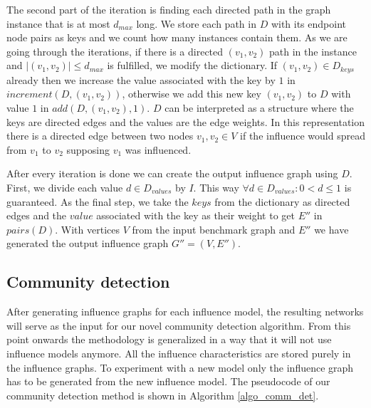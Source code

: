 \documentclass[pdflatex,sn-mathphys-ay]{sn-jnl}
\begin{document}
The second part of the iteration is finding each directed path in the graph instance that is at most $d_{max}$ long. We store each path in $D$ with its endpoint node pairs as keys and we count how many instances contain them. As we are going through the iterations, if there is a directed $(v_1,v_2)$ path in the instance and $|(v_1,v_2)| \leq d_{max}$ is fulfilled, we modify the dictionary. If $(v_1,v_2) \in D_{keys}$ already then we increase the value associated with the key by $1$ in $increment(D,(v_1,v_2))$, otherwise we add this new key $(v_1,v_2)$ to $D$ with value $1$ in $add(D,(v_1,v_2),1)$. $D$ can be interpreted as a structure where the keys are directed edges and the values are the edge weights. In this representation there is a directed edge between two nodes $v_1,v_2 \in V$ if the influence would spread from $v_1$ to $v_2$ supposing $v_1$ was influenced.

After every iteration is done we can create the output influence graph using $D$. First, we divide each value $d \in D_{values}$ by $I$. This way $\forall d \in D_{values}: 0 < d \leq 1$ is guaranteed. As the final step, we take the $keys$ from the dictionary as directed edges and the $value$ associated with the key as their weight to get $E''$ in $pairs(D)$. With vertices $V$ from the input benchmark graph and $E''$ we have generated the output influence graph $G''=(V,E'')$.


\subsection{Community detection}\label{subsec_commdet}

After generating influence graphs for each influence model, the resulting networks will serve as the input for our novel community detection algorithm. From this point onwards the methodology is generalized in a way that it will not use influence models anymore. All the influence characteristics are stored purely in the influence graphs. To experiment with a new model only the influence graph has to be generated from the new influence model. The pseudocode of our community detection method is shown in Algorithm \ref{algo_comm_det}.
\end{document}
